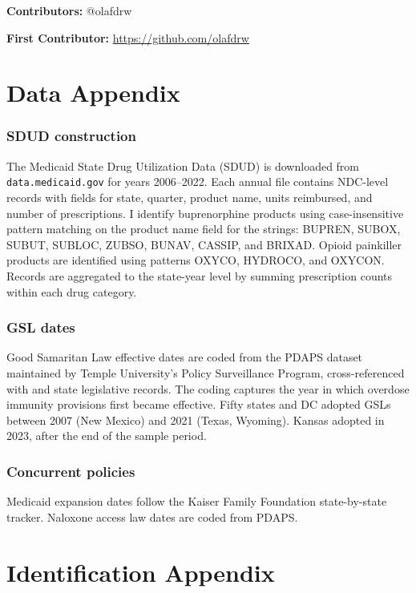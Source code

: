 \documentclass[12pt]{article}
\begin{document}
\noindent\textbf{Contributors:} @olafdrw

\noindent\textbf{First Contributor:} \url{https://github.com/olafdrw}

\label{apep_main_text_end}
\newpage


\newpage
\appendix

\section{Data Appendix}

\subsubsection*{SDUD construction} The Medicaid State Drug Utilization Data (SDUD) is downloaded from \texttt{data.medicaid.gov} for years 2006--2022. Each annual file contains NDC-level records with fields for state, quarter, product name, units reimbursed, and number of prescriptions. I identify buprenorphine products using case-insensitive pattern matching on the product name field for the strings: BUPREN, SUBOX, SUBUT, SUBLOC, ZUBSO, BUNAV, CASSIP, and BRIXAD. Opioid painkiller products are identified using patterns OXYCO, HYDROCO, and OXYCON. Records are aggregated to the state-year level by summing prescription counts within each drug category.

\subsubsection*{GSL dates} Good Samaritan Law effective dates are coded from the PDAPS dataset maintained by Temple University's Policy Surveillance Program, cross-referenced with \citet{rees2019} and state legislative records. The coding captures the year in which overdose immunity provisions first became effective. Fifty states and DC adopted GSLs between 2007 (New Mexico) and 2021 (Texas, Wyoming). Kansas adopted in 2023, after the end of the sample period.

\subsubsection*{Concurrent policies} Medicaid expansion dates follow the Kaiser Family Foundation state-by-state tracker. Naloxone access law dates are coded from PDAPS.

\section{Identification Appendix}
\end{document}
